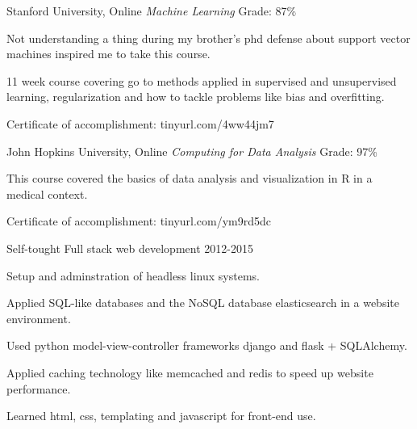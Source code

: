 

\begin{cventries}

\cventry
  {Stanford University, Online} %
  {\textit{Machine Learning}}
  {Grade: 87\%} %
  {} %
  {
    \begin{cvitems} %
      \item {Not understanding a thing during my brother's phd defense about support vector machines inspired me to take this course.}
      \item {11 week course covering go to methods applied in supervised and unsupervised learning, regularization and how to tackle problems like bias and overfitting.}
      \item {Certificate of accomplishment: tinyurl.com/4ww44jm7}
    \end{cvitems}
  }
\cventry
  {John Hopkins University, Online} %
  {\textit{Computing for Data Analysis}} %
  {Grade: 97\%} %
  {} %
  {
    \begin{cvitems} %
      \item {This course covered the basics of data analysis and visualization in R in a medical context.}
      \item {Certificate of accomplishment: tinyurl.com/ym9rd5dc}
    \end{cvitems}
  }
\cventry
  {Self-tought} %
  {Full stack web development} %
  {2012-2015} %
  {} %
  {
    \begin{cvitems} %
      \item {Setup and adminstration of headless linux systems.}
      \item {Applied SQL-like databases and the NoSQL database elasticsearch in a website environment.}
      \item {Used python model-view-controller frameworks django and flask + SQLAlchemy.}
      \item {Applied caching technology like memcached and redis to speed up website performance.}
      \item {Learned html, css, templating and javascript for front-end use.}
    \end{cvitems}
  }
\end{cventries}
